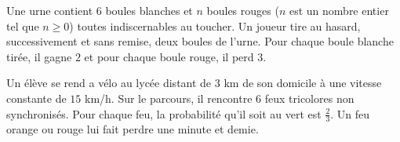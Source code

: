 \documentclass[palatino,code]{ensaexam}
\begin{document}
\begin{questions}


  Une urne contient $6$ boules blanches et $n$ boules rouges ($n$ est un nombre
  entier tel que $n\geq 0$) toutes indiscernables au toucher. Un joueur tire au
  hasard, successivement et sans remise, deux boules de l'urne. Pour chaque
  boule blanche tirée, il gagne $2$ et pour chaque boule rouge, il perd $3$.

  

Un élève se rend a vélo au lycée distant de $3$ km de son  domicile à une
vitesse constante de $15$ km/h. Sur  le parcours, il rencontre $6$ feux
tricolores non synchronisés. Pour chaque feu,  la probabilité qu'il soit au vert
est $\frac{2}{3}$. Un feu orange ou rouge lui fait perdre une minute et demie.\\


\end{questions}
\end{document}
